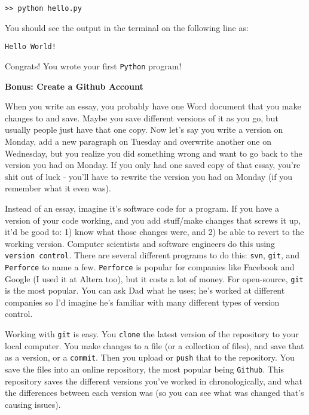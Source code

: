 \documentclass[letterpaper,14pt,oneside]{extarticle}
\begin{document}
\begin{enumerate}[leftmargin=*]
\texttt{>> python hello.py}

You should see the output in the terminal on the following line as:

\texttt{Hello World!}

Congrats! You wrote your first \texttt{Python} program!

\end{enumerate}

\newpage
\begin{flushleft}
\large {\bfseries Bonus: Create a Github Account}
\end{flushleft}

\normalsize
 When you write an essay, you probably have one Word document that you make changes to and save. Maybe you save different versions of it as you go, but usually people just have that one copy. Now let's say you write a version on Monday, add a new paragraph on Tuesday and overwrite another one on Wednesday, but you realize you did something wrong and want to go back to the version you had on Monday. If you only had one saved copy of that essay, you're shit out of luck - you'll have to rewrite the version you had on Monday (if you remember what it even was).
\newline

Instead of an essay, imagine it's software code for a program. If you have a version of your code working, and you add stuff/make changes that screws it up, it'd be good to: 1) know what those changes were, and 2) be able to revert to the working version. Computer scientists and software engineers do this using \texttt{version control}. There are several different programs to do this: \texttt{svn}, \texttt{git}, and \texttt{Perforce} to name a few. \texttt{Perforce} is popular for companies like Facebook and Google (I used it at Altera too), but it costs a lot of money. For open-source, \texttt{git} is the most popular. You can ask Dad what he uses; he's worked at different companies so I'd imagine he's familiar with many different types of version control.
\newline

Working with \texttt{git} is easy. You \texttt{clone} the latest version of the repository to your local computer. You make changes to a file (or a collection of files), and save that as a version, or a \texttt{commit}. Then you upload or \texttt{push} that to the repository. You save the files into an online repository, the most popular being \texttt{Github}. This repository saves the different versions you've worked in chronologically, and what the differences between each version was (so you can see what was changed that's causing issues).
\newline
\end{document}
